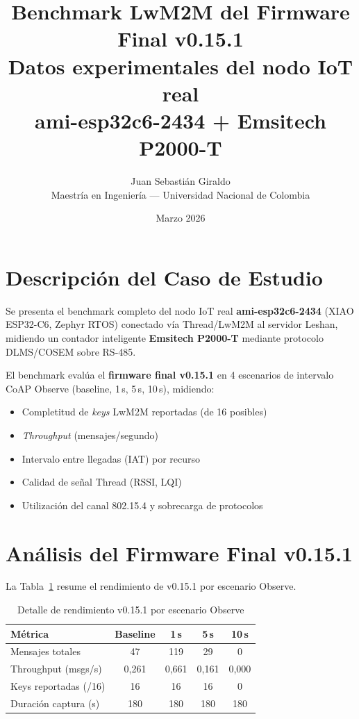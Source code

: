 \documentclass[11pt,spanish,letterpaper]{article}
\title{\textbf{Benchmark LwM2M del Firmware Final v0.15.1}\\[0.5em]
\large Datos experimentales del nodo IoT real\\
ami-esp32c6-2434 + Emsitech P2000-T}
\author{Juan Sebastián Giraldo\\
\small Maestría en Ingeniería --- Universidad Nacional de Colombia}
\date{Marzo 2026}
\begin{document}
\maketitle
\thispagestyle{fancy}

\section{Descripción del Caso de Estudio}

Se presenta el benchmark completo del nodo IoT real \textbf{ami-esp32c6-2434}
(XIAO ESP32-C6, Zephyr RTOS) conectado vía Thread/LwM2M al servidor Leshan,
midiendo un contador inteligente \textbf{Emsitech P2000-T} mediante protocolo
DLMS/COSEM sobre RS-485.

El benchmark evalúa el \textbf{firmware final v0.15.1} en 4 escenarios de
intervalo CoAP Observe (baseline, 1\,s, 5\,s, 10\,s), midiendo:
\begin{itemize}
    \item Completitud de \emph{keys} LwM2M reportadas (de 16 posibles)
    \item \emph{Throughput} (mensajes/segundo)
    \item Intervalo entre llegadas (IAT) por recurso
    \item Calidad de señal Thread (RSSI, LQI)
    \item Utilización del canal 802.15.4 y sobrecarga de protocolos
\end{itemize}

\section{Análisis del Firmware Final v0.15.1}

La Tabla~\ref{tab:v0151-detail} resume el rendimiento de v0.15.1 por
escenario Observe.

\begin{table}[htbp]
\centering
\caption{Detalle de rendimiento v0.15.1 por escenario Observe}
\label{tab:v0151-detail}
\begin{tabular}{lcccc}
\toprule
\textbf{Métrica} & \textbf{Baseline} & \textbf{1\,s} & \textbf{5\,s} & \textbf{10\,s} \\
\midrule
Mensajes totales     & 47    & 119   & 29    & 0 \\
Throughput (msgs/s)  & 0,261 & 0,661 & 0,161 & 0,000 \\
Keys reportadas (/16)& 16    & 16    & 16    & 0 \\
Duración captura (s) & 180   & 180   & 180   & 180 \\
\bottomrule
\end{tabular}
\end{table}
\end{document}
